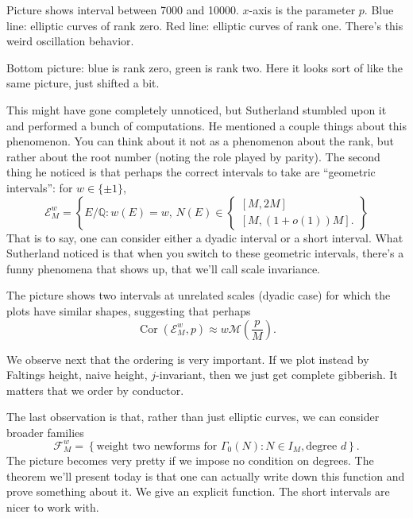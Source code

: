 \documentclass[reqno]{amsart} 
\begin{document}
Picture shows interval between 7000 and 10000.  $x$-axis is the parameter $p$.  Blue line: elliptic curves of rank zero.  Red line: elliptic curves of rank one.  There's this weird oscillation behavior.

Bottom picture: blue is rank zero, green is rank two.  Here it looks sort of like the same picture, just shifted a bit.

This might have gone completely unnoticed, but Sutherland stumbled upon it and performed a bunch of computations.  He mentioned a couple things about this phenomenon.  You can think about it not as a phenomenon about the rank, but rather about the root number (noting the role played by parity).  The second thing he noticed is that perhaps the correct intervals to take are ``geometric intervals'': for $w \in \{\pm 1\}$,
\begin{equation*}
  \mathcal{E}_M^w
  = \left\{ E / \mathbb{Q} : w(E) = w, \,
    N(E) \in
    \begin{cases}
[M,2 M]  \\
[M, (1 + o(1)) M].
\end{cases}
  \right\}
\end{equation*}
That is to say, one can consider either a dyadic interval or a short interval.  What Sutherland noticed is that when you switch to these geometric intervals, there's a funny phenomena that shows up, that we'll call scale invariance.

The picture shows two intervals at unrelated scales (dyadic case) for which the plots have similar shapes, suggesting that perhaps
\begin{equation*}
  \operatorname{Cor} (\mathcal{E}_M^w , p )
  \approx w \mathcal{M} \left( \frac{p}{M} \right).
\end{equation*}

We observe next that the ordering is very important.  If we plot instead by Faltings height, naive height, $j$-invariant, then we just get complete gibberish.  It matters that we order by conductor.

The last observation is that, rather than just elliptic curves, we can consider broader families
\begin{equation*}
  \mathcal{F}_M^w = \left\{ \text{weight two newforms for } \Gamma_0 (N) : N \in I_M,
    \text{degree $d$}
  \right\}.
\end{equation*}
The picture becomes very pretty if we impose no condition on degrees.  The theorem we'll present today is that one can actually write down this function and prove something about it.  We give an explicit function.  The short intervals are nicer to work with.
\end{document}

